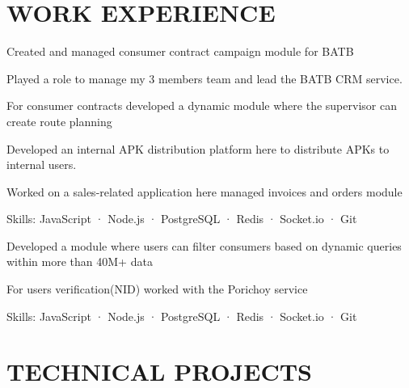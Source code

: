 \documentclass[]{deedy-resume-openfont}
\begin{document}
\begin{minipage}[t]{0.65\textwidth} 

\section{WORK EXPERIENCE}
\vspace{\topsep}
\begin{tightemize}
\item Created and managed consumer contract campaign module for BATB
\item Played a role to manage my 3 members team and lead the BATB CRM service.
\item For consumer contracts developed a dynamic module where the supervisor can create route planning
\item Developed an internal APK distribution platform here to distribute APKs to internal users.
\item Worked on a sales-related application here managed invoices and orders module
\item Skills: JavaScript · Node.js · PostgreSQL · Redis · Socket.io · Git
\end{tightemize}
\sectionsep

\vspace{\topsep}
\begin{tightemize}
\item Developed a module where users can filter consumers based on dynamic queries within more than 40M+ data
\item For users verification(NID) worked with the Porichoy service
\item Skills: JavaScript · Node.js · PostgreSQL · Redis · Socket.io · Git
\end{tightemize}
\sectionsep


\section{TECHNICAL PROJECTS}


\end{minipage}
\end{document}
